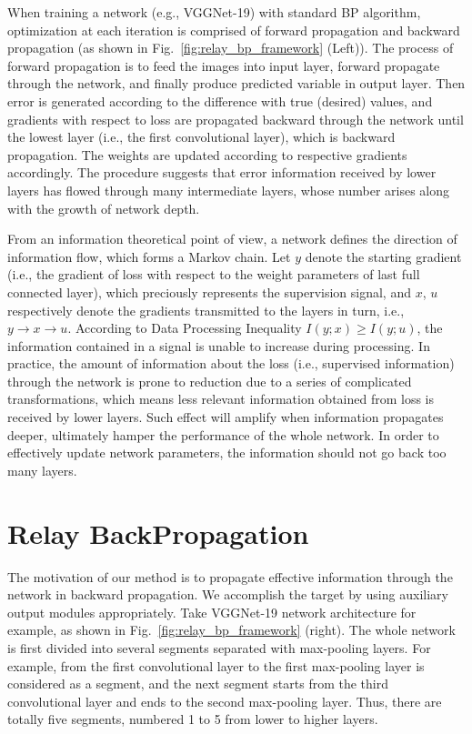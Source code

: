 \documentclass[runningheads]{llncs}
\begin{document}
When training a network (e.g., VGGNet-19) with standard BP algorithm, optimization at each iteration is comprised of forward propagation and backward propagation (as shown in Fig.~\ref{fig:relay_bp_framework} (Left)). The process of forward propagation is to feed the images into input layer, forward propagate through the network, and finally produce predicted variable in output layer. Then error is generated according to the difference with true (desired) values, and gradients with respect to loss are propagated backward through the network until the lowest layer (i.e., the first convolutional layer), which is backward propagation. The weights are updated according to respective gradients accordingly. The procedure suggests that error information received by lower layers has flowed through many intermediate layers, whose number arises along with the growth of network depth.

From an information theoretical point of view, a network defines the direction of information flow, which forms a Markov chain. Let $y$ denote the starting gradient (i.e., the gradient of loss with respect to the weight parameters of last full connected layer), which preciously represents the supervision signal, and $x$, $u$ respectively denote the gradients transmitted to the layers in turn, i.e., $y \to x \to u$. According to Data Processing Inequality \cite{cover_2006} $I(y;x) \ge I(y;u)$, the information contained in a signal is unable to increase during processing. In practice, the amount of information about the loss (i.e., supervised information) through the network is prone to reduction due to a series of complicated transformations, which means less relevant information obtained from loss is received by lower layers. Such effect will amplify when information propagates deeper, ultimately hamper the performance of the whole network. In order to effectively update network parameters, the information should not go back too many layers.

\section{Relay BackPropagation}

The motivation of our method is to propagate effective information through the network in backward propagation. We accomplish the target by using auxiliary output modules appropriately. Take VGGNet-19 network architecture for example, as shown in Fig.~\ref{fig:relay_bp_framework} (right). The whole network is first divided into several segments separated with max-pooling layers. For example, from the first convolutional layer to the first max-pooling layer is considered as a segment, and the next segment starts from the third convolutional layer and ends to the second max-pooling layer. Thus, there are totally five segments, numbered 1 to 5 from lower to higher layers.
\end{document}
